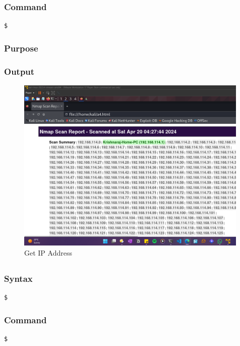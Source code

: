 \documentclass[11pt]{article}
\begin{document}
\subsubsection*{Command}
\begin{verbatim}
$
\end{verbatim}

\subsubsection*{Purpose}

\subsubsection*{Output}
\begin{figure}[H]
    \centering
    \includegraphics[width=0.99\textwidth]{a4 (5).png}
    \caption{Get IP Address}
    \label{fig:1}
\end{figure}
\subsection{}

\subsubsection*{Syntax}
\begin{verbatim}
$
\end{verbatim}

\subsubsection*{Command}
\begin{verbatim}
$
\end{verbatim}
\end{document}
